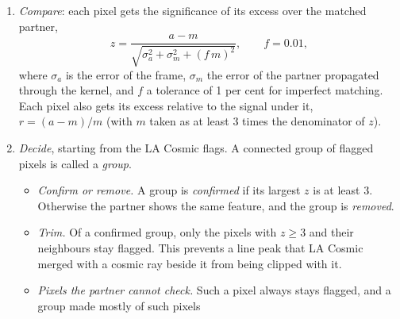 \begin{enumerate}
went from 11.6 to 14.7\,pixels between the two exposures of 2026 September 6 (and its flux changed by a factor 0.63);
a scale and a shift cannot absorb that. As in image subtraction \citep{Alard1998}, the partner is therefore convolved
with a kernel along the slit, fitted to the frame:
\[
m(y)=\sum_{|k|\le6}c_k\,s\,b(y+k)+c_{\rm sky}+c'_{\rm sky}\,y ,
\]
where $m$ is the matched partner, $y$ the pixel along the slit, $s$ the scale of step 4, $c_k$ the kernel for an offset
of $k$ pixels, and $c_{\rm sky}$ and $c'_{\rm sky}$ a constant and a slope that absorb a difference between the two sky
models. The kernel is fitted on blocks of 15 columns, on both exposures median-filtered over those columns, with
4$\sigma$ clipping. The median filter is needed for two reasons: a fit on the noisy partner itself is biased towards
zero, and the filter keeps cosmic rays out of the fit. The kernel is then applied to the unfiltered partner, after its
flagged and masked pixels have been replaced by the filtered values. Without this replacement the kernel, which has
negative side lobes when it sharpens the profile, would print a negative copy of a cosmic ray of the partner next to
it. A kernel shared by 15 columns cannot reproduce a hit of a pixel or two, so the matching does not remove real cosmic
rays from the comparison.
\item \textit{Compare}: each pixel gets the significance of its excess over the matched partner,
\[
z=\frac{a-m}{\sqrt{\sigma_a^2+\sigma_m^2+(f\,m)^2}},\qquad f=0.01,
\]
where $\sigma_a$ is the error of the frame, $\sigma_m$ the error of the partner propagated through the kernel, and $f$
a tolerance of 1 per cent for imperfect matching. Each pixel also gets its excess relative to the signal under it,
$r=(a-m)/m$ (with $m$ taken as at least 3 times the denominator of $z$).
\item \textit{Decide}, starting from the LA Cosmic flags. A connected group of flagged pixels is called a
\textit{group}.
\begin{itemize}
\item \textit{Confirm or remove.} A group is \textit{confirmed} if its largest $z$ is at least 3. Otherwise the partner
shows the same feature, and the group is \textit{removed}.
\item \textit{Trim.} Of a confirmed group, only the pixels with $z\ge3$ and their neighbours stay flagged. This prevents
a line peak that LA Cosmic merged with a cosmic ray beside it from being clipped with it.
\item \textit{Pixels the partner cannot check.} Such a pixel always stays flagged, and a group made mostly of such pixels

\end{itemize}
\end{enumerate}

